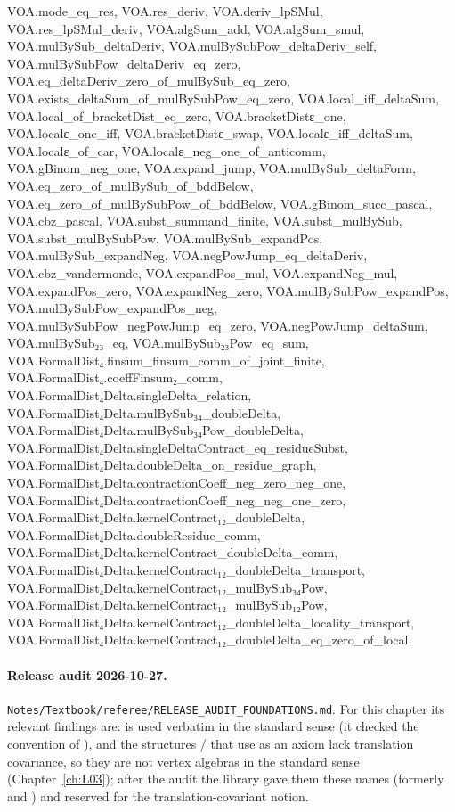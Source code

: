 \begin{plaincode}
VOA.mode_eq_res, VOA.res_deriv, VOA.deriv_lpSMul, VOA.res_lpSMul_deriv, VOA.algSum_add,
VOA.algSum_smul, VOA.mulBySub_deltaDeriv, VOA.mulBySubPow_deltaDeriv_self,
VOA.mulBySubPow_deltaDeriv_eq_zero, VOA.eq_deltaDeriv_zero_of_mulBySub_eq_zero,
VOA.exists_deltaSum_of_mulBySubPow_eq_zero, VOA.local_iff_deltaSum,
VOA.local_of_bracketDist_eq_zero, VOA.bracketDistε_one, VOA.localε_one_iff, VOA.bracketDistε_swap,
VOA.localε_iff_deltaSum, VOA.localε_of_car, VOA.localε_neg_one_of_anticomm, VOA.gBinom_neg_one,
VOA.expand_jump, VOA.mulBySub_deltaForm, VOA.eq_zero_of_mulBySub_of_bddBelow,
VOA.eq_zero_of_mulBySubPow_of_bddBelow, VOA.gBinom_succ_pascal, VOA.cbz_pascal,
VOA.subst_summand_finite, VOA.subst_mulBySub, VOA.subst_mulBySubPow, VOA.mulBySub_expandPos,
VOA.mulBySub_expandNeg, VOA.negPowJump_eq_deltaDeriv, VOA.cbz_vandermonde, VOA.expandPos_mul,
VOA.expandNeg_mul, VOA.expandPos_zero, VOA.expandNeg_zero, VOA.mulBySubPow_expandPos,
VOA.mulBySubPow_expandPos_neg, VOA.mulBySubPow_negPowJump_eq_zero, VOA.negPowJump_deltaSum,
VOA.mulBySub₂₃_eq, VOA.mulBySub₂₃Pow_eq_sum, VOA.FormalDist₄.finsum_finsum_comm_of_joint_finite,
VOA.FormalDist₄.coeffFinsum₂_comm, VOA.FormalDist₄Delta.singleDelta_relation,
VOA.FormalDist₄Delta.mulBySub₃₄_doubleDelta, VOA.FormalDist₄Delta.mulBySub₃₄Pow_doubleDelta,
VOA.FormalDist₄Delta.singleDeltaContract_eq_residueSubst,
VOA.FormalDist₄Delta.doubleDelta_on_residue_graph,
VOA.FormalDist₄Delta.contractionCoeff_neg_zero_neg_one,
VOA.FormalDist₄Delta.contractionCoeff_neg_neg_one_zero,
VOA.FormalDist₄Delta.kernelContract₁₂_doubleDelta, VOA.FormalDist₄Delta.doubleResidue_comm,
VOA.FormalDist₄Delta.kernelContract_doubleDelta_comm,
VOA.FormalDist₄Delta.kernelContract₁₂_doubleDelta_transport,
VOA.FormalDist₄Delta.kernelContract₁₂_mulBySub₃₄Pow,
VOA.FormalDist₄Delta.kernelContract₁₂_mulBySub₁₂Pow,
VOA.FormalDist₄Delta.kernelContract₁₂_doubleDelta_locality_transport,
VOA.FormalDist₄Delta.kernelContract₁₂_doubleDelta_eq_zero_of_local
\end{plaincode}

\paragraph{Release audit 2026-10-27.} \texttt{Notes/\allowbreak Textbook/\allowbreak referee/\allowbreak RELEASE\_AUDIT\_FOUNDATIONS.md}.
For this chapter its relevant findings are:  is used verbatim in the standard sense (it checked the convention
of ), and the structures / that use  as an axiom lack
translation covariance, so they are not vertex algebras in the standard sense (Chapter~\ref{ch:L03}); after the audit
the library gave them these names (formerly  and ) and reserved  for
the translation-covariant notion.

